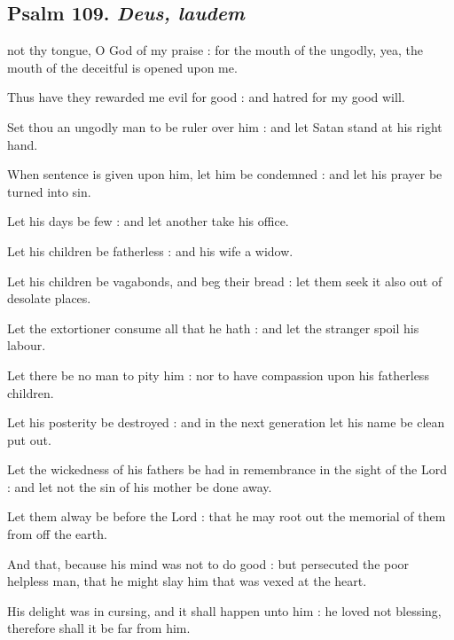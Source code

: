 \subsection{Psalm 109. \textit{Deus, laudem}}

 not thy tongue, O God of my praise : for the mouth of the ungodly, yea, the mouth of the deceitful is opened upon me.\par
{}
Thus have they rewarded me evil for good : and hatred for my good will.\par
{}Set thou an ungodly man to be ruler over him : and let Satan stand at his right hand.\par
{}When sentence is given upon him, let him be condemned : and let his prayer be turned into sin.\par
{}Let his days be few : and let another take his office.\par
{}Let his children be fatherless : and his wife a widow.\par
{}Let his children be vagabonds, and beg their bread : let them seek it also out of desolate places.\par
{}Let the extortioner consume all that he hath : and let the stranger spoil his labour.\par
{}Let there be no man to pity him : nor to have compassion upon his fatherless children.\par
{}Let his posterity be destroyed : and in the next generation let his name be clean put out.\par
{}Let the wickedness of his fathers be had in remembrance in the sight of the Lord : and let not the sin of his mother be done away.\par
{}Let them alway be before the Lord : that he may root out the memorial of them from off the earth.\par
{}And that, because his mind was not to do good : but persecuted the poor helpless man, that he might slay him that was vexed at the heart.\par
{}His delight was in cursing, and it shall happen unto him : he loved not blessing, therefore shall it be far from him.\par
